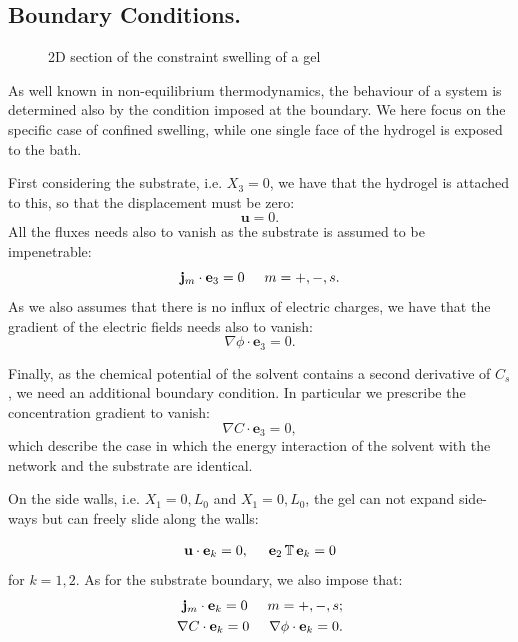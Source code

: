 \documentclass[12pt]{extarticle}
\begin{document}
\subsection{Boundary Conditions.}
\begin{figure}
	\centering
	\def\svgwidth{0.9\linewidth}
	
	\caption{2D section of the constraint swelling of a gel}
\end{figure}

As well known in non-equilibrium thermodynamics, the behaviour of a system is determined also by the condition imposed at the boundary. We here focus on the specific case of confined swelling, while one single face of the hydrogel is exposed to the bath. 

First considering the substrate, i.e. $X_3=0$, we have that the hydrogel is attached to this, so that the displacement must be zero:
\begin{equation}
\mathbf{u}=0.
\end{equation}
All the fluxes needs also to vanish as the substrate is assumed to be impenetrable:
\begin{equation}
\mathbf{j}_m\cdot \mathbf{e}_3=0 \hspace{5mm} m=+,-,s.
\end{equation}
As we also assumes that there is no influx of electric charges, we have that the gradient of the electric fields needs also to vanish:
\begin{equation}
\nabla \phi \cdot \mathbf{e}_3 = 0.
\end{equation}

Finally, as the chemical potential of the solvent contains a second derivative of $C_s$, we need an additional boundary condition. In particular we prescribe the concentration gradient to vanish:
\begin{equation}
\nabla C \cdot \mathbf{e}_3 = 0,
\end{equation}
which describe the case in which the energy interaction of the solvent with the network and the substrate are identical. 

On the side walls, i.e. $X_1=0,L_0$ and $X_1=0,L_0$, the gel can not expand side-ways but can freely slide along the walls:

\begin{equation}
 \mathbf{u}\cdot \mathbf{e}_k = 0, \hspace{5mm} \mathbf{e}_2 \,\mathbb{T}\, \mathbf{e}_k=0
\end{equation}
for $k=1,2$. As for the substrate boundary, we also impose that:
\begin{eqnarray}
\mathbf{j}_m\cdot \mathbf{e}_k=0 \hspace{5mm} m=+,-,s;\\
\nabla C \cdot \mathbf{e}_k = 0 \hspace{5mm} \nabla \phi \cdot \mathbf{e}_k = 0.
\end{eqnarray}
\end{document}
